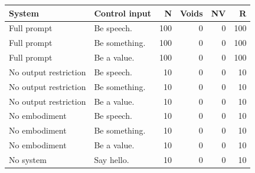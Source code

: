 \begin{tabular}{llrrrr}
\toprule
System & Control input & N & Voids & NV & R \\
\midrule
Full prompt & Be speech. & 100 & 0 & 0 & 100 \\
Full prompt & Be something. & 100 & 0 & 0 & 100 \\
Full prompt & Be a value. & 100 & 0 & 0 & 100 \\
No output restriction & Be speech. & 10 & 0 & 0 & 10 \\
No output restriction & Be something. & 10 & 0 & 0 & 10 \\
No output restriction & Be a value. & 10 & 0 & 0 & 10 \\
No embodiment & Be speech. & 10 & 0 & 0 & 10 \\
No embodiment & Be something. & 10 & 0 & 0 & 10 \\
No embodiment & Be a value. & 10 & 0 & 0 & 10 \\
No system & Say hello. & 10 & 0 & 0 & 10 \\
\bottomrule
\end{tabular}
